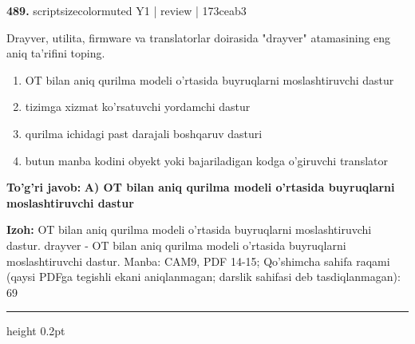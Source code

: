 \documentclass[10pt,a4paper]{article}
\begin{document}
{\bfseries\sffamily\color{ink} 489.} {scriptsizecolor{muted} Y1 | review | 173ceab3}
\par
Drayver, utilita, firmware va translatorlar doirasida "drayver" atamasining eng aniq ta'rifini toping.
\begin{enumerate}[label=\Alph*),leftmargin=9mm]
\item OT bilan aniq qurilma modeli o'rtasida buyruqlarni moslashtiruvchi dastur
\item tizimga xizmat ko'rsatuvchi yordamchi dastur
\item qurilma ichidagi past darajali boshqaruv dasturi
\item butun manba kodini obyekt yoki bajariladigan kodga o'giruvchi translator
\end{enumerate}
\begin{tcolorbox}[enhanced,breakable,colback=teal!4,colframe=teal!60!black,boxrule=0.45pt,arc=1.2mm,left=2.7mm,right=2.7mm,top=1.8mm,bottom=1.8mm,before skip=2mm,after skip=2mm]
{\bfseries\sffamily\color{teal}To'g'ri javob:} \textbf{A) OT bilan aniq qurilma modeli o'rtasida buyruqlarni moslashtiruvchi dastur}
\par\smallskip
{\bfseries Izoh:} OT bilan aniq qurilma modeli o'rtasida buyruqlarni moslashtiruvchi dastur. drayver - OT bilan aniq qurilma modeli o'rtasida buyruqlarni moslashtiruvchi dastur. Manba: CAM9, PDF 14-15; Qo'shimcha sahifa raqami (qaysi PDFga tegishli ekani aniqlanmagan; darslik sahifasi deb tasdiqlanmagan): 69
\end{tcolorbox}
\vspace{2mm}\hrule height 0.2pt\vspace{3mm}
\end{document}

